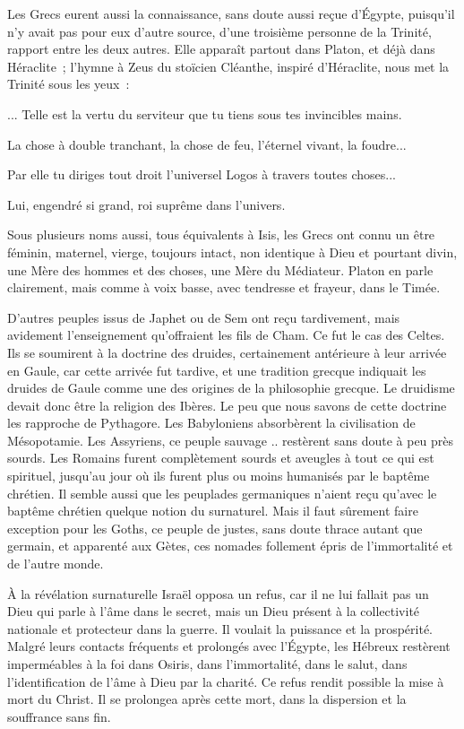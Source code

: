 \documentclass[french,twoside]{book} %
\begin{document}
Les Grecs eurent aussi la connaissance, sans doute aussi reçue d'Égypte, puisqu'il n'y avait pas pour eux d'autre source, d'une troisième personne de la Trinité, rapport entre les deux autres. Elle apparaît partout dans Platon, et déjà dans Héraclite ; l'hymne à Zeus du stoïcien Cléanthe, inspiré d'Héraclite, nous met la Trinité sous les yeux :\par
... Telle est la vertu du serviteur que tu tiens sous tes invincibles mains.\par
La chose à double tranchant, la chose de feu, l'éternel vivant, la foudre...\par
Par elle tu diriges tout droit l'universel Logos à travers toutes choses...\par
Lui, engendré si grand, roi suprême dans l'univers.\par
Sous plusieurs noms aussi, tous équivalents à Isis, les Grecs ont connu un être féminin, maternel, vierge, toujours intact, non identique à Dieu et pourtant divin, une Mère des hommes et des choses, une Mère du Médiateur. Platon en parle clairement, mais comme à voix basse, avec tendresse et frayeur, dans le Timée.\par
D'autres peuples issus de Japhet ou de Sem ont reçu tardivement, mais avidement l'enseignement qu'offraient les fils de Cham. Ce fut le cas des Celtes. Ils se soumirent à la doctrine des druides, certainement antérieure à leur arrivée en Gaule, car cette arrivée fut tardive, et une tradition grecque indiquait les druides de Gaule comme une des origines de la philosophie grecque. Le druidisme devait donc être la religion des Ibères. Le peu que nous savons de cette doctrine les rapproche de Pythagore. Les Babyloniens absorbèrent la civilisation de Mésopotamie. Les Assyriens, ce peuple sauvage .. restèrent sans doute à peu près sourds. Les Romains furent complètement sourds et aveugles à tout ce qui est spirituel, jusqu'au jour où ils furent plus ou moins humanisés par le baptême chrétien. Il semble aussi que les peuplades germaniques n'aient reçu qu'avec le baptême chrétien quelque notion du surnaturel. Mais il faut sûrement faire exception pour les Goths, ce peuple de justes, sans doute thrace autant que germain, et apparenté aux Gètes, ces nomades follement épris de l'immortalité et de l'autre monde.\par
À la révélation surnaturelle Israël opposa un refus, car il ne lui fallait pas un Dieu qui parle à l'âme dans le secret, mais un Dieu présent à la collectivité nationale et protecteur dans la guerre. Il voulait la puissance et la prospérité. Malgré leurs contacts fréquents et prolongés avec l'Égypte, les Hébreux restèrent imperméables à la foi dans Osiris, dans l'immortalité, dans le salut, dans l'identification de l'âme à Dieu par la charité. Ce refus rendit possible la mise à mort du Christ. Il se prolongea après cette mort, dans la dispersion et la souffrance sans fin.\par
\end{document}
